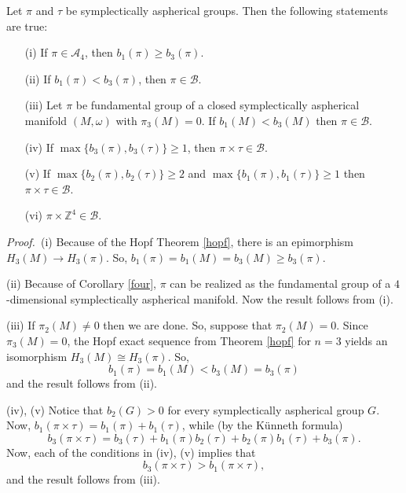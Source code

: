 \documentclass[12pt, twoside]{amsart}
\theoremstyle{plain}
\theoremstyle{definition}
\numberwithin{equation}{section}
\def\AAA{{\mathcal A}}
\def\BBB{{\mathcal B}}
\def\p{{\it Proof.\ }}
\begin{document}
\begin{theorem}
\label{sasgroup}
Let $\pi $ and $\tau $ be symplectically aspherical groups.
Then the following statements are true:

\begin{enumerate}
     \item[(i)] If $\pi \in {\AAA}_4$, then $b_1(\pi )\geq b_3(\pi)$.

     \item[(ii)] If $b_1(\pi ) < b_3(\pi )$, then $\pi \in {\BBB}$.

     \item[(iii)] Let $\pi $ be fundamental group of a closed symplectically
           aspherical manifold $(M,\omega )$ with $\pi _3(M)=0$.
           If $b_1(M) < b_3(M)$ then $\pi \in {\BBB}$.

     \item[(iv)] If $ \max\{b_3(\pi ),b_3(\tau )\} \geq 1$,
           then $\pi \times \tau \in {\BBB}$.

     \item[(v)] If $\max\{b_2(\pi ),b_2(\tau )\} \geq 2$ and
           $\max\{b_1(\pi ),b_1(\tau )\} \geq 1$ 
           then $\pi \times \tau \in {\BBB}$.

     \item[(vi)] $\pi \times \mathbb Z^4 \in {\BBB}$.
   \end{enumerate}
\end{theorem}

\p (i) Because of the Hopf Theorem \ref{hopf}, there is an epimorphism $H_3(M) 
\to
H_3(\pi)$. So, $b_1(\pi)=b_1(M)=b_3(M)\ge b_3(\pi)$.

\par (ii)
Because of Corollary \ref{four}, $\pi$ can be realized as the fundamental 
group of a
$4$-dimensional symplectically aspherical manifold. Now the result follows 
from (i).

\par (iii) If $\pi_2(M)\not=0$ then we are done. So, suppose that 
$\pi_2(M)=0$. Since
$\pi_3(M)=0$, the Hopf exact sequence from Theorem \ref{hopf} for $n=3$ yields 
an isomorphism
$H_3(M) \cong H_3(\pi)$. So, 
$$ b_1(\pi)=b_1(M) < b_3(M) = b_3(\pi)
$$ and the result follows from (ii). 

\par (iv), (v) Notice that $b_2(G)>0$ for every symplectically aspherical 
group $G$. Now,
$b_1(\pi\times \tau)=b_1(\pi) + b_1(\tau)$, while (by the K\"unneth formula)
$$ b_3(\pi \times \tau) = b_3(\tau) + b_1(\pi)b_2(\tau) + b_2(\pi)b_1(\tau)+
b_3(\pi).
$$ Now, each of the conditions in (iv), (v) implies that 
$$ b_3(\pi \times \tau) > b_1(\pi \times \tau),
$$ and  the result follows from (iii).
\end{document}
